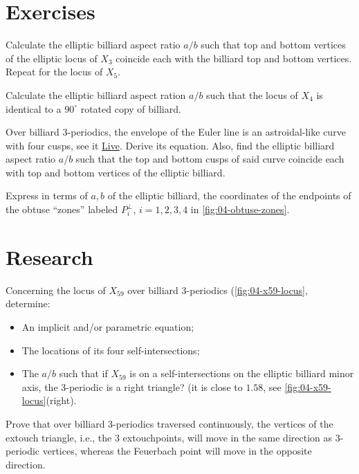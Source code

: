 \section{Exercises}

\begin{exercise}
Calculate the elliptic billiard aspect ratio $a/b$ such that top and bottom vertices of the elliptic locus of $X_3$ coincide each with the billiard top and bottom vertices. Repeat for the locus of $X_5$.
\end{exercise}

\begin{exercise}
Calculate the elliptic billiard aspect ration $a/b$ such that the locus of $X_4$ is identical to a $90^\circ$ rotated copy of billiard.
\end{exercise}

\begin{exercise}
Over billiard 3-periodics, the envelope of the Euler line is an astroidal-like curve with four cusps, see it \href{https://bit.ly/3yiCvrn}{Live}. Derive its equation. Also, find the elliptic billiard aspect ratio $a/b$ such that the top and bottom cusps of said curve coincide each with top and bottom vertices of the elliptic billiard.
\end{exercise}

\begin{exercise}
Express in terms of $a,b$ of the elliptic billiard, the coordinates of the endpoints of the obtuse ``zones'' labeled $P_i^{\perp}$, $i=1,2,3,4$ in  \cref{fig:04-obtuse-zones}.
\end{exercise}

\section{Research}

\begin{question}
Concerning the locus of $X_{59}$ over billiard 3-periodics (\cref{fig:04-x59-locus}, determine:
\begin{itemize}
\item An implicit and/or parametric equation;
\item The locations of its four self-intersections;
\item The $a/b$ such that if $X_{59}$ is on a self-intersections on the elliptic billiard minor axis, the 3-periodic is a right triangle? (it is close to $1.58$, see \cref{fig:04-x59-locus}(right).
\end{itemize}
\end{question}

\begin{question}
Prove that over billiard 3-periodics traversed continuously, the vertices of the extouch triangle, i.e., the 3 extouchpoints, will move in the same direction as 3-periodic vertices, whereas the Feuerbach point will move in the opposite direction.  
\end{question}